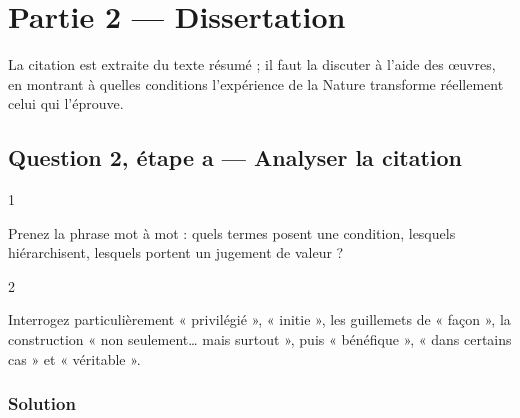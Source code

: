 \documentclass[11pt,a4paper]{article}
\begin{document}
\hypertarget{partie-2-dissertation}{%
\section{Partie 2 --- Dissertation}\label{partie-2-dissertation}}

La citation est extraite du texte résumé ; il faut la discuter à l'aide des œuvres, en montrant à quelles conditions l'expérience de la Nature transforme réellement celui qui l'éprouve.

\hypertarget{question-2-uxe9tape-a-analyser-la-citation}{%
\subsection{Question 2, étape a --- Analyser la citation}\label{question-2-uxe9tape-a-analyser-la-citation}}

\begin{indication}{1}

Prenez la phrase mot à mot : quels termes posent une condition, lesquels hiérarchisent, lesquels portent un jugement de valeur ?

\end{indication}

\begin{indication}{2}

Interrogez particulièrement « privilégié », « initie », les guillemets de « façon », la construction « non seulement\ldots{} mais surtout », puis « bénéfique », « dans certains cas » et « véritable ».

\end{indication}

\hypertarget{solution-3}{%
\subsubsection{Solution}\label{solution-3}}
\end{document}

